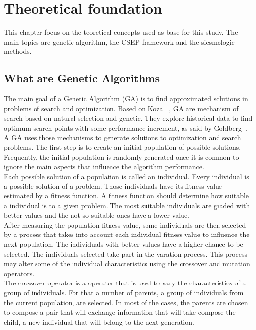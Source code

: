 \chapter{Theoretical foundation}
This chapter focus on the teoretical concepts used as base for this study. The main topics are genetic algorithm, the CSEP framework and the siesmologic methods.\\

\section{What are Genetic Algorithms}
The main goal of a Genetic Algorithm (GA) is to find approximated solutions in problems of search and optimization. Based on Koza~\cite{Koza2003} , GA are mechanism of search based on natural selection and genetic. They explore historical data to find optimum search points with some performance increment, as said by Goldberg~\cite{Goldberg:1989:GAS:534133}.\\

A GA uses those mechanisms to generate solutions to optimization and search problems. The first step is to create an initial population of possible solutions. Frequently, the initial population is randomly generated once it is common to ignore the main aspects that influence the algorithm performance.\\

Each possible solution of a population is called an individual. Every individual is a possible solution of a problem. Those individuals have its fitness value estimated by a fitness function. A fitness function should determine how suitable a individual is to a given problem. The most suitable individuals are graded with better values and the not so suitable ones have a lower value.\\

After measuring the population fitness value, some individuals are then selected by a process that takes into account each individual fitness value to influence the next population. The individuals with better values have a higher chance to be selected. The individuals selected take part in the varation process. This process may alter some of the individual characteristics using the crossover and mutation operators.\\

The crossover operator is a operator that is used to vary the characteristics of a group of individuals. For that a number of parents, a group of individuals from the current population, are selected. In most of the cases, the parents are chosen to compose a pair that will exchange information that will take compose the child, a new individual that will belong to the next generation.\\

